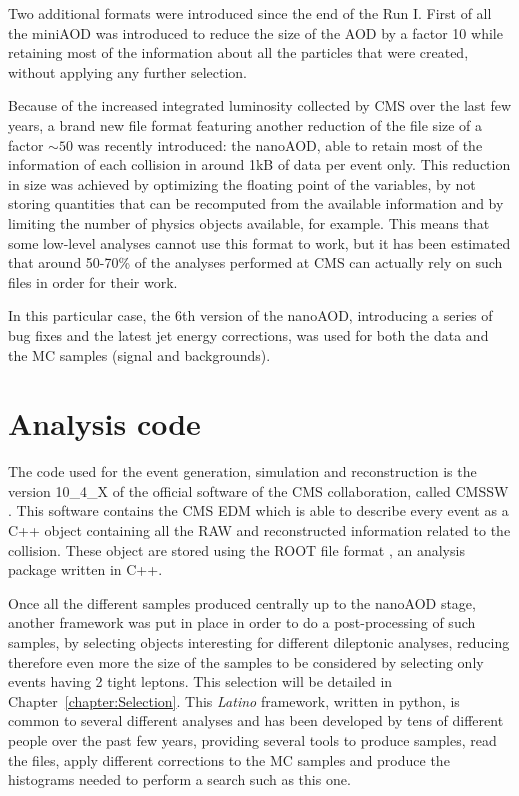 \documentclass[a4paper, 10pt, openright]{report}
\begin{document}
Two additional formats were introduced since the end of the Run I. First of all the miniAOD was introduced to reduce the size of the \ac{AOD} by a factor 10 while retaining most of the information about all the particles that were created, without applying any further selection.

Because of the increased integrated luminosity collected by \ac{CMS} over the last few years, a brand new file format featuring another reduction of the file size of a factor $\sim 50$ was recently introduced: the nanoAOD, able to retain most of the information of each collision in around 1kB of data per event only. This reduction in size was achieved by optimizing the floating point of the variables, by not storing quantities that can be recomputed from the available information and by limiting the number of physics objects available, for example. This means that some low-level analyses cannot use this format to work, but it has been estimated that around 50-70\% of the analyses performed at \ac{CMS} can actually rely on such files in order for their work. 

In this particular case, the 6th version of the nanoAOD, introducing a series of bug fixes and the latest jet energy corrections, was used for both the data and the \ac{MC} samples (signal and backgrounds). 

\section{Analysis code} \label{section:Code}

The code used for the event generation, simulation and reconstruction is the version 10\_4\_X of the official software of the \ac{CMS} collaboration, called CMSSW \cite{CMSSW}. This software contains the \ac{CMS} \ac{EDM} which is able to describe every event as a C++ object containing all the RAW and reconstructed information related to the collision. These object are stored using the ROOT file format \cite{ROOT}, an analysis package written in C++. 

Once all the different samples produced centrally up to the nanoAOD stage, another framework was put in place in order to do a post-processing of such samples, by selecting objects interesting for different dileptonic analyses, reducing therefore even more the size of the samples to be considered by selecting only events having 2 tight leptons. This selection will be detailed in Chapter~\ref{chapter:Selection}. This \textit{Latino} framework, written in python, is common to several different analyses and has been developed by tens of different people over the past few years, providing several tools to produce samples, read the files, apply different corrections to the \ac{MC} samples and produce the histograms needed to perform a search such as this one.
\end{document}
